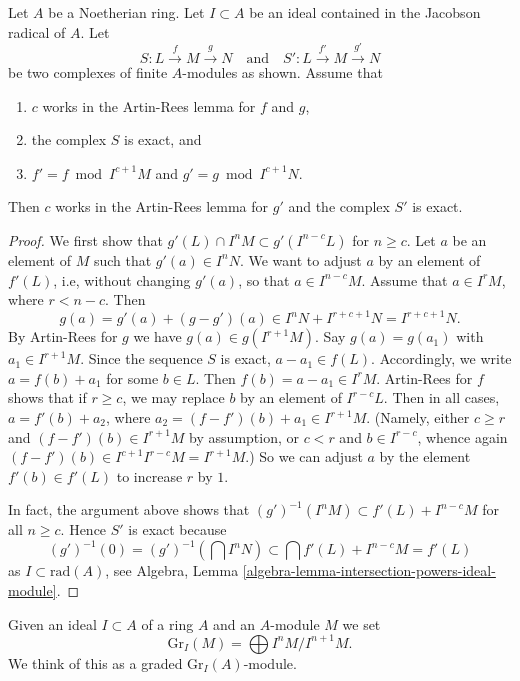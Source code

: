 \begin{lemma}
\label{lemma-approximate-complex}
Let $A$ be a Noetherian ring. Let $I \subset A$ be an ideal contained in
the Jacobson radical of $A$. Let
$$
S : L \xrightarrow{f} M \xrightarrow{g} N
\quad\text{and}\quad
S' : L \xrightarrow{f'} M \xrightarrow{g'} N
$$
be two complexes of finite $A$-modules as shown. Assume that
\begin{enumerate}
\item $c$ works in the Artin-Rees lemma for $f$ and $g$,
\item the complex $S$ is exact, and
\item $f' = f \bmod I^{c + 1}M$ and $g' = g \bmod I^{c + 1}N$.
\end{enumerate}
Then $c$ works in the Artin-Rees lemma for $g'$ and the
complex $S'$ is exact.
\end{lemma}

\begin{proof}
We first show that $g'(L) \cap I^nM \subset g'(I^{n - c}L)$ for $n \geq c$.
Let $a$ be an element of $M$ such that $g'(a) \in I^nN$. We want to
adjust $a$ by an element of $f'(L)$, i.e, without changing $g'(a)$, so
that $a \in I^{n-c}M$. Assume that $a \in I^rM$, where $r < n - c$.
Then
$$
g(a) = g'(a) + (g - g')(a) \in
I^n N + I^{r + c + 1}N = I^{r + c + 1}N.
$$
By Artin-Rees for $g$ we have $g(a) \in g(I^{r + 1}M)$. Say $g(a) = g(a_1)$
with $a_1 \in I^{r + 1}M$. Since the sequence $S$ is exact, $a - a_1 \in f(L)$.
Accordingly, we write $a = f(b) + a_1$ for some $b \in L$.
Then $f(b) = a - a_1 \in I^rM$. Artin-Rees for $f$ shows that
if $r \geq c$, we may replace $b$ by an element of $I^{r - c}L$.
Then in all cases, $a = f'(b) + a_2$, where
$a_2 = (f - f')(b) + a_1 \in I^{r + 1}M$. (Namely, either $c \geq r$
and $(f - f')(b) \in I^{r + 1}M$ by assumption, or $c < r$ and
$b \in I^{r - c}$, whence again $(f - f')(b) \in I^{c + 1} I^{r - c} M =
I^{r + 1}M$.) So we can adjust $a$ by the element $f'(b) \in f'(L)$ to
increase $r$ by $1$.

\medskip\noindent
In fact, the argument above shows that
$(g')^{-1}(I^nM) \subset f'(L) + I^{n - c}M$ for all $n \geq c$.
Hence $S'$ is exact because
$$
(g')^{-1}(0) = (g')^{-1}(\bigcap I^nN) \subset
\bigcap f'(L) + I^{n - c}M = f'(L)
$$
as $I \subset \text{rad}(A)$, see Algebra, Lemma
\ref{algebra-lemma-intersection-powers-ideal-module}.
\end{proof}

\noindent
Given an ideal $I \subset A$ of a ring $A$ and an $A$-module $M$
we set
$$
\text{Gr}_I(M) = \bigoplus I^nM/I^{n + 1}M.
$$
We think of this as a graded $\text{Gr}_I(A)$-module.

